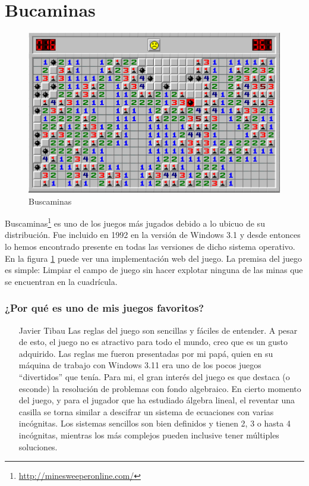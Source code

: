 \section{Bucaminas}

\begin{figure}[htbp]
\begin{center}
\includegraphics[width=.60\textwidth]{./imagenes/minesweeper.png}
\caption{Buscaminas}
\label{Buscaminas}
\end{center}
\end{figure}
Buscaminas\footnote{\url{http://minesweeperonline.com/}} es uno de los juegos más jugados debido a lo ubicuo de su distribución. Fue incluido en 1992 en la versión de Windows 3.1 y desde entonces lo hemos encontrado presente en todas las versiones de dicho sistema operativo.
En la figura \ref{Buscaminas} puede ver una implementación web del juego.
La premisa del juego es simple: Limpiar el campo de juego sin hacer explotar ninguna de las minas que se encuentran en la cuadrícula.

\subsubsection{¿Por qué es uno de mis juegos favoritos?}
\begin{itemize}
\item[Javier Tibau] Las reglas del juego son sencillas y fáciles de entender. A pesar de esto, el juego no es atractivo para todo el mundo, creo que es un gusto adquirido. Las reglas me fueron presentadas por mi papá, quien en su máquina de trabajo con Windows 3.11 era uno de los pocos juegos ``divertidos'' que tenía. Para mi, el gran interés del juego es que destaca (o esconde) la resolución de problemas con fondo algebraico. En cierto momento del juego, y para el jugador que ha estudiado álgebra lineal, el reventar una casilla se torna similar a descifrar un sistema de ecuaciones con varias incógnitas. Los sistemas sencillos son bien definidos y tienen 2, 3 o hasta 4 incógnitas, mientras los más complejos pueden inclusive tener múltiples soluciones.
\end{itemize}
